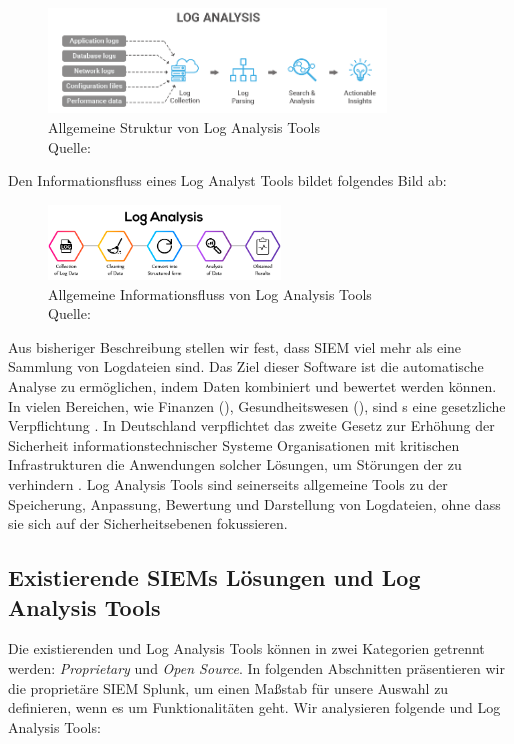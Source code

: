 \begin{figure}[H]
   \centering
   \includegraphics[width=0.8\textwidth]{assets/2.1_p2.png}
   \caption{Allgemeine Struktur von Log Analysis Tools\\Quelle: \citep{Tek-Tools_LGTArchitektur} }
   \centering
\end{figure}

Den Informationsfluss eines Log Analyst Tools bildet folgendes Bild ab:

\begin{figure}[H]
   \centering
   \includegraphics[width=0.55\textwidth]{assets/2.2_p2.png}
   \caption{Allgemeine Informationsfluss von Log Analysis Tools\\Quelle: \citep{Neptune_LATInfoFluss} }
   \centering
\end{figure}

Aus bisheriger Beschreibung stellen wir fest, dass \gls{SIEM} viel mehr als eine Sammlung von Logdateien sind. Das Ziel dieser Software ist die automatische Analyse zu ermöglichen, indem Daten kombiniert und bewertet werden können. In vielen Bereichen, wie Finanzen (), Gesundheitswesen (), sind s eine gesetzliche Verpflichtung \citep{Jog_SIEM}. In Deutschland verpflichtet das zweite Gesetz zur Erhöhung der Sicherheit informationstechnischer Systeme Organisationen mit kritischen Infrastrukturen die Anwendungen solcher Lösungen, um Störungen der  zu verhindern \citep{BSI_ITSG}. Log Analysis Tools sind seinerseits allgemeine Tools zu der Speicherung, Anpassung, Bewertung und Darstellung von Logdateien, ohne dass sie sich auf der Sicherheitsebenen fokussieren.



\subsection{Existierende SIEMs Lösungen und Log Analysis Tools}
Die existierenden  und Log Analysis Tools können in zwei Kategorien getrennt werden: \textit{\gls{Proprietary}} und  \textit{\gls{Open Source}}. In folgenden Abschnitten präsentieren wir die proprietäre \gls{SIEM} Splunk, um einen Maßstab für unsere Auswahl zu definieren, wenn es um Funktionalitäten geht. Wir analysieren folgende  und Log Analysis Tools: 

